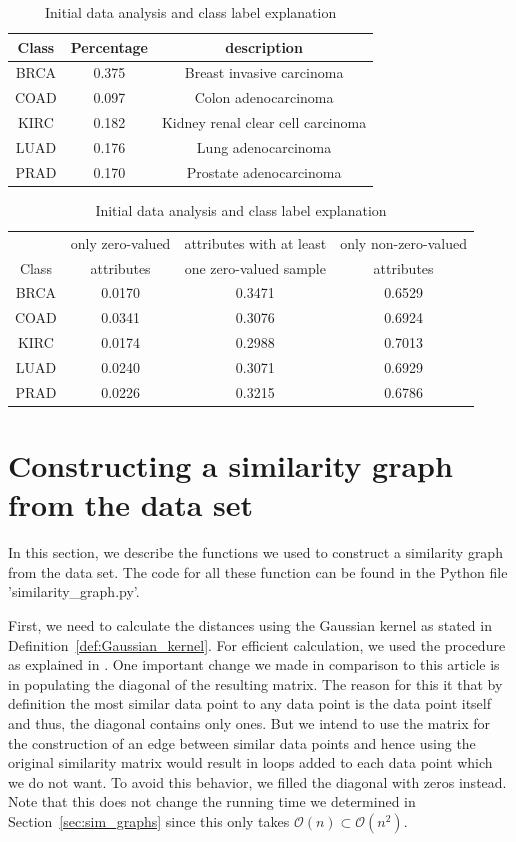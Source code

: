 \documentclass[paper=a4,fontsize=11pt,DIV=8,BCOR=5mm,twoside,pdftex,bibtotocnumbered]{scrreprt}
\theoremstyle{plain}
\begin{document}
\begin{table}
	\caption{Initial data analysis and class label explanation}
	\centering
	\begin{tabular}{|c||c|c|}
		\hline
		Class & Percentage  & description \\
		\hline
		BRCA & 0.375 & Breast invasive carcinoma \\
		COAD & 0.097 & Colon adenocarcinoma \\
		KIRC & 0.182 & Kidney renal clear cell carcinoma \\
		LUAD & 0.176 & Lung adenocarcinoma \\
		PRAD & 0.170 & Prostate adenocarcinoma \\
		\hline
	\end{tabular}
	
	\begin{tabular}{|c||c|c|c|}
		\hline
		& only zero-valued & attributes with at least & only non-zero-valued \\
		Class & attributes & one zero-valued sample & attributes\\
		\hline
		BRCA & 0.0170 & 0.3471 & 0.6529 \\
		COAD & 0.0341 & 0.3076 & 0.6924 \\
		KIRC  & 0.0174 & 0.2988 & 0.7013 \\
		LUAD & 0.0240 & 0.3071 & 0.6929 \\
		PRAD  & 0.0226 & 0.3215 & 0.6786 \\
		\hline
	\end{tabular}
	\label{tab:ida}
\end{table}

\section{Constructing a similarity graph from the data set}\label{sec:constr_sim_graph} 
In this section, we describe the functions we used to construct a similarity graph from the data set.  The code for all these function can be found in the Python file 'similarity\_graph.py'. 

First, we need to calculate the distances using the Gaussian kernel as stated in Definition~\ref{def:Gaussian_kernel}. For efficient calculation, we used the procedure as explained in \cite{Gokhale2023}. One important change we made in comparison to this article is in populating the diagonal of the resulting matrix. The reason for this it that by definition the most similar data point to any data point is the data point itself and thus, the diagonal contains only ones. But we intend to use the matrix for the construction of an edge between similar data points and hence using the original similarity matrix would result in loops added to each data point which we do not want. To avoid this behavior, we filled the diagonal with zeros instead. Note that this does not change the running time we determined in Section~\ref{sec:sim_graphs} since this only takes $\mathcal{O}(n)\subset\mathcal{O}(n^2)$.
\end{document}
